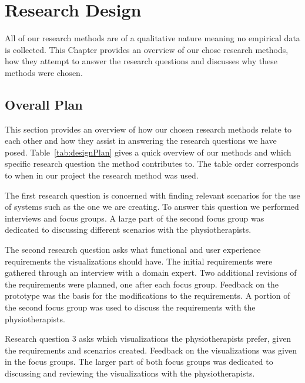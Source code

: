 \chapter{Research Design}
\label{ch:researchDesign}
All of our research methods are of a qualitative nature meaning no empirical data is collected. This Chapter provides an overview of our chose research methods, how they attempt to answer the research questions and discusses why these methods were chosen.

\section{Overall Plan}
\label{sec:overview}
This section provides an overview of how our chosen research methods relate to each other and how they assist in answering the research questions we have posed. Table~\ref{tab:designPlan} gives a quick overview of our methods and which specific research question the method contributes to. The table order corresponds to when in our project the research method was used.

The first research question is concerned with finding relevant scenarios for the use of systems such as the one we are creating. To answer this question we performed interviews and focus groups. A large part of the second focus group was dedicated to discussing different scenarios with the physiotherapists.

The second research question asks what functional and user experience requirements the visualizations should have. The initial requirements were gathered through an interview with a domain expert. Two additional revisions of the requirements were planned, one after each focus group. Feedback on the prototype was the basis for the modifications to the requirements. A portion of the second focus group was used to discuss the requirements with the physiotherapists.

Research question 3 asks which visualizations the physiotherapists prefer, given the requirements and scenarios created. Feedback on the visualizations was given in the focus groups. The larger part of both focus groups was dedicated to discussing and reviewing the visualizations with the physiotherapists. 


